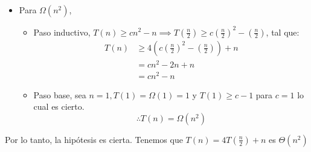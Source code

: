 \begin{problema}
\begin{sol}
\begin{itemize}
\begin{itemize}
            \end{itemize}
            \item Para $\Omega(n^2)$,
             \begin{itemize}
                \item Paso inductivo, $T(n)\geq cn^2-n \implies T\left(\frac{n}{2}\right)\geq c\left(\frac{n}{2}\right)^2-\left(\frac{n}{2}\right)$, tal que: 
                \begin{align*}
                    T(n)&\geq 4\left( c\left(\frac{n}{2}\right)^2-\left(\frac{n}{2}\right)\right)+n\\
                        &= cn^2 -2n+n\\
                        &= cn^2-n
                \end{align*}
                \item Paso base, sea $n=1, T(1)=\Omega(1)=1$ y $T(1)\geq c-1$  para $c=1$ lo cual es cierto.
                $$\therefore T(n)=\Omega(n^2)$$
            
            \end{itemize}
        \end{itemize}
        
        
        Por lo tanto, la hipótesis es cierta. Tenemos que $T(n)=4 T\left(\frac{n}{2}\right)+n$ es $\Theta\left(n^2\right)$
    \end{sol}
\end{problema}

